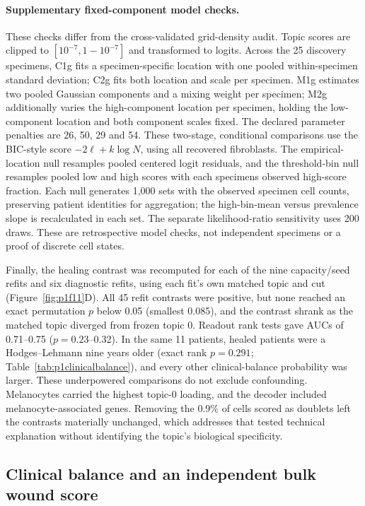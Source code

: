 \documentclass[10pt,a4paper]{article}
\begin{document}
\paragraph{Supplementary fixed-component model checks.} These checks differ from the cross-validated grid-density audit. Topic scores are clipped to $[10^{-7},1-10^{-7}]$ and transformed to logits. Across the 25 discovery specimens, C1g fits a specimen-specific location with one pooled within-specimen standard deviation; C2g fits both location and scale per specimen. M1g estimates two pooled Gaussian components and a mixing weight per specimen; M2g additionally varies the high-component location per specimen, holding the low-component location and both component scales fixed. The declared parameter penalties are 26, 50, 29 and 54. These two-stage, conditional comparisons use the BIC-style score $-2\ell+k\log N$, using all recovered fibroblasts. The empirical-location null resamples pooled centered logit residuals, and the threshold-bin null resamples pooled low and high scores with each specimen\textquotesingle{}s observed high-score fraction. Each null generates 1,000 sets with the observed specimen cell counts, preserving patient identities for aggregation; the high-bin-mean versus prevalence slope is recalculated in each set. The separate likelihood-ratio sensitivity uses 200 draws. These are retrospective model checks, not independent specimens or a proof of discrete cell states.

Finally, the healing contrast was recomputed for each of the nine capacity/seed refits and six diagnostic refits, using each fit's own matched topic and cut (Figure~\ref{fig:p1f11}D). All 45 refit contrasts were positive, but none reached an exact permutation $p$ below 0.05 (smallest 0.085), and the contrast shrank as the matched topic diverged from frozen topic 0. Readout rank tests gave AUCs of 0.71--0.75 ($p=0.23$--0.32). In the same 11 patients, healed patients were a Hodges--Lehmann nine years older (exact rank $p=0.291$; Table~\ref{tab:p1clinicalbalance}), and every other clinical-balance probability was larger. These underpowered comparisons do not exclude confounding. Melanocytes carried the highest topic-0 loading, and the decoder included melanocyte-associated genes. Removing the 0.9\% of cells scored as doublets left the contrasts materially unchanged, which addresses that tested technical explanation without identifying the topic's biological specificity.




\subsection{Clinical balance and an independent bulk wound score}
\end{document}
